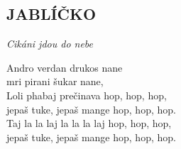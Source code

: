 \begin{flushleft}
	\section*{\Huge JABLÍČKO}
	\emph{Cikáni jdou do nebe}
\end{flushleft}

Andro verdan drukos nane\\
mri pirani šukar nane,\\

Loli phabaj prečinava hop, hop, hop,\\
jepaš tuke, jepaš mange hop, hop, hop.\\

Taj la la laj la \hspace{0,8cm}la la laj hop, hop, hop,\\
jepaš tuke, jepaš mange hop, hop, hop.

\newpage

